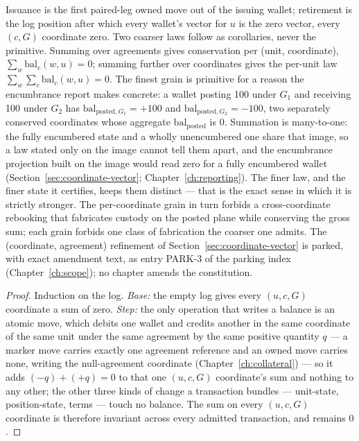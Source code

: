 Issuance is the first paired-leg owned move out of the issuing wallet; retirement is the
log position after which every wallet's vector for $u$ is the zero vector, every $(c,G)$
coordinate zero. Two coarser laws follow as corollaries, never the primitive. Summing over
agreements gives conservation per (unit, coordinate), $\sum_w \mathrm{bal}_c(w,u)=0$;
summing further over coordinates gives the per-unit law $\sum_w\sum_c \mathrm{bal}_c(w,u)=0$.
The finest grain is primitive for a reason the encumbrance report makes concrete: a wallet
posting 100 under $G_1$ and receiving 100 under $G_2$ has
$\mathrm{bal}_{\text{posted},G_1}=+100$ and $\mathrm{bal}_{\text{posted},G_2}=-100$, two
separately conserved coordinates whose aggregate $\mathrm{bal}_{\text{posted}}$ is $0$.
Summation is many-to-one: the fully encumbered state and a wholly unencumbered one share
that image, so a law stated only on the image cannot tell them apart, and the encumbrance
projection built on the image would read zero for a fully encumbered wallet
(Section~\ref{sec:coordinate-vector}; Chapter~\ref{ch:reporting}). The finer law,
and the finer state it certifies, keeps them distinct --- that is the exact sense in which
it is strictly stronger. The per-coordinate grain in turn forbids a cross-coordinate
rebooking that fabricates custody on the posted plane while conserving the gross sum; each
grain forbids one class of fabrication the coarser one admits. The (coordinate, agreement)
refinement of Section~\ref{sec:coordinate-vector} is parked, with exact amendment
text, as entry PARK-3 of the parking index (Chapter~\ref{ch:scope}); no chapter amends the
constitution.

\begin{proof}
Induction on the log. \emph{Base:} the empty log gives every $(u,c,G)$ coordinate a sum of
zero. \emph{Step:} the only operation that writes a balance is an atomic move, which debits
one wallet and credits another in the same coordinate of the same unit under the same
agreement by the same positive quantity $q$ --- a marker move carries exactly one agreement
reference and an owned move carries none, writing the null-agreement coordinate
(Chapter~\ref{ch:collateral}) --- so it adds $(-q)+(+q)=0$ to that one $(u,c,G)$ coordinate's
sum and nothing to any other; the other three kinds of change a transaction bundles ---
unit-state, position-state, terms --- touch no balance. The sum on every $(u,c,G)$
coordinate is therefore invariant across every admitted transaction, and remains $0$.
\end{proof}

